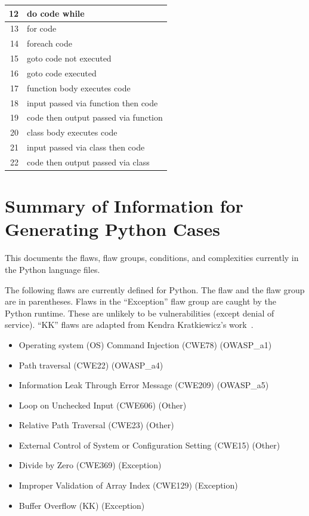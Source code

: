 \begin{appendices}
\begin{table}[H]
\begin{tabular}{|r|l|}
12 & do code while \\
\hline
13 & for code \\
\hline
14 & foreach code \\
\hline
15 & goto code not executed \\
\hline
16 & goto code executed \\
\hline
17 & function body executes code \\
\hline
18 & input passed via function then code \\
\hline
19 & code then output passed via function \\
\hline
20 & class body executes code \\
\hline
21 & input passed via class then code \\
\hline
22 & code then output passed via class \\
\hline
\end{tabular}
\label{tab:complexity IDs for PHP}
\end{table}

\newpage

\section{Summary of Information for Generating Python Cases}
\label{sec:Python language}

This documents the flaws, flaw groups, conditions, and complexities currently in the
Python language files.

The following flaws are currently defined for Python.
The flaw and the flaw group are in
parentheses.  Flaws in the ``Exception'' flaw group are caught by the Python runtime.
These are unlikely to be vulnerabilities (except denial of service).
``KK'' flaws are adapted from Kendra Kratkiewicz's work~\cite{Kratkiewicz2005}.
\begin{itemize}[nosep]
    \item Operating system (OS) Command Injection (CWE78) (OWASP\_a1)
    \item Path traversal (CWE22) (OWASP\_a4)
    \item Information Leak Through Error Message (CWE209) (OWASP\_a5)
    \item Loop on Unchecked Input (CWE606) (Other)
    \item Relative Path Traversal (CWE23) (Other)
    \item External Control of System or Configuration Setting (CWE15) (Other)
    \item Divide by Zero (CWE369) (Exception)
    \item Improper Validation of Array Index (CWE129) (Exception)
    \item Buffer Overflow (KK) (Exception)
\end{itemize}


\end{appendices}
